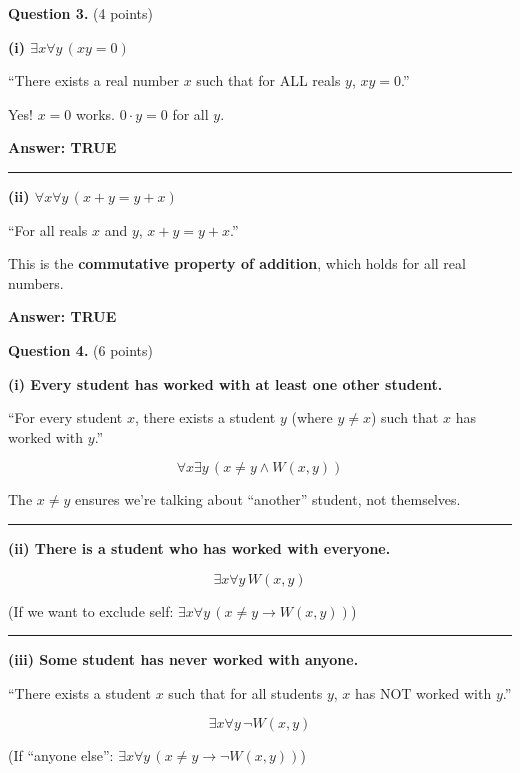 \documentclass[11pt,a4paper]{article}
\begin{document}
\vspace{15pt}

\textbf{Question 3.} (4 points)

\begin{solnbox}
\textbf{(i) $\exists x \forall y\, (xy = 0)$}

``There exists a real number $x$ such that for ALL reals $y$, $xy = 0$.''

Yes! $x = 0$ works. $0 \cdot y = 0$ for all $y$.

\textbf{Answer: TRUE}

\rule{\linewidth}{0.3pt}

\textbf{(ii) $\forall x \forall y\, (x + y = y + x)$}

``For all reals $x$ and $y$, $x + y = y + x$.''

This is the \textbf{commutative property of addition}, which holds for all real numbers.

\textbf{Answer: TRUE}
\end{solnbox}

\vspace{15pt}

\textbf{Question 4.} (6 points)

\begin{solnbox}
\textbf{(i) Every student has worked with at least one other student.}

``For every student $x$, there exists a student $y$ (where $y \neq x$) such that $x$ has worked with $y$.''

$$\boxed{\forall x \exists y\, (x \neq y \land W(x, y))}$$

The $x \neq y$ ensures we're talking about ``another'' student, not themselves.

\rule{\linewidth}{0.3pt}

\textbf{(ii) There is a student who has worked with everyone.}

$$\boxed{\exists x \forall y\, W(x, y)}$$

(If we want to exclude self: $\exists x \forall y\, (x \neq y \to W(x, y))$)

\rule{\linewidth}{0.3pt}

\textbf{(iii) Some student has never worked with anyone.}

``There exists a student $x$ such that for all students $y$, $x$ has NOT worked with $y$.''

$$\boxed{\exists x \forall y\, \neg W(x, y)}$$

(If ``anyone else'': $\exists x \forall y\, (x \neq y \to \neg W(x, y))$)
\end{solnbox}
\end{document}
